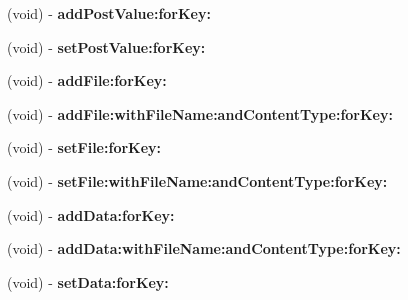 \begin{DoxyCompactItemize}
\item 
\hypertarget{interface_a_s_i_form_data_request_af9571a143a9feeb009c33c458447aa98}{
(void) -\/ {\bfseries add\-Post\-Value\-:for\-Key\-:}}
\label{interface_a_s_i_form_data_request_af9571a143a9feeb009c33c458447aa98}

\item 
\hypertarget{interface_a_s_i_form_data_request_a90236e7099afbab72bb160029df5a368}{
(void) -\/ {\bfseries set\-Post\-Value\-:for\-Key\-:}}
\label{interface_a_s_i_form_data_request_a90236e7099afbab72bb160029df5a368}

\item 
\hypertarget{interface_a_s_i_form_data_request_afa340cd3b263a621a4f52015cdb8c568}{
(void) -\/ {\bfseries add\-File\-:for\-Key\-:}}
\label{interface_a_s_i_form_data_request_afa340cd3b263a621a4f52015cdb8c568}

\item 
\hypertarget{interface_a_s_i_form_data_request_ae413f676daaf869aa3cac76371466c16}{
(void) -\/ {\bfseries add\-File\-:with\-File\-Name\-:and\-Content\-Type\-:for\-Key\-:}}
\label{interface_a_s_i_form_data_request_ae413f676daaf869aa3cac76371466c16}

\item 
\hypertarget{interface_a_s_i_form_data_request_a8b097474a664290880231fd4439f352e}{
(void) -\/ {\bfseries set\-File\-:for\-Key\-:}}
\label{interface_a_s_i_form_data_request_a8b097474a664290880231fd4439f352e}

\item 
\hypertarget{interface_a_s_i_form_data_request_a1b319de7b302e41e0f2b62b04efd4976}{
(void) -\/ {\bfseries set\-File\-:with\-File\-Name\-:and\-Content\-Type\-:for\-Key\-:}}
\label{interface_a_s_i_form_data_request_a1b319de7b302e41e0f2b62b04efd4976}

\item 
\hypertarget{interface_a_s_i_form_data_request_abeb27ef3dc358d5e0a27ba3a077a6653}{
(void) -\/ {\bfseries add\-Data\-:for\-Key\-:}}
\label{interface_a_s_i_form_data_request_abeb27ef3dc358d5e0a27ba3a077a6653}

\item 
\hypertarget{interface_a_s_i_form_data_request_a8ea88f81e036a80e7e7b7f9af04ac421}{
(void) -\/ {\bfseries add\-Data\-:with\-File\-Name\-:and\-Content\-Type\-:for\-Key\-:}}
\label{interface_a_s_i_form_data_request_a8ea88f81e036a80e7e7b7f9af04ac421}

\item 
\hypertarget{interface_a_s_i_form_data_request_a707a5cef615835146cdbed3ceca31016}{
(void) -\/ {\bfseries set\-Data\-:for\-Key\-:}}
\label{interface_a_s_i_form_data_request_a707a5cef615835146cdbed3ceca31016}


\end{DoxyCompactItemize}
